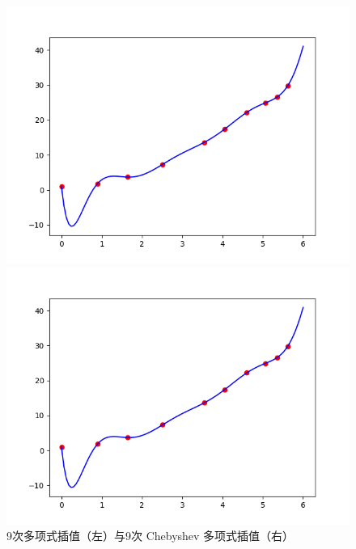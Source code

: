 \documentclass[UTF8,ctexart,a4paper,11pt,openany]{article}
\theoremstyle{definition}
\begin{document}
        \begin{figure}[H]
            \begin{minipage}{0.5\textwidth}
                \centering
                \includegraphics[width=\linewidth]{pics/P7.3.png}
            \end{minipage}%
            \begin{minipage}{0.5\textwidth}
                \centering
                \includegraphics[width=\linewidth]{pics/P7.4.png}
            \end{minipage}
        \caption{9次多项式插值（左）与9次 Chebyshev 多项式插值（右）}
        \end{figure}
        
\end{document}
